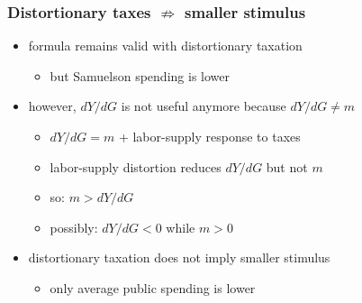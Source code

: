 \documentclass[12pt,xcolor={dvipsnames},hyperref={pdftex,pdfpagemode=UseNone,hidelinks,pdfdisplaydoctitle=true},usepdftitle=false]{beamer}
\begin{document}
\begin{frame}
\frametitle{Distortionary taxes $\nRightarrow$ smaller stimulus}
\begin{itemize}
\item formula remains valid with distortionary taxation
\begin{itemize}
	\item but Samuelson spending is lower
\end{itemize}
\item however, $dY/dG$ is not useful anymore because $dY/dG \neq m$
\begin{itemize}
\item $dY/dG = m$ + labor-supply response to taxes 
\item labor-supply distortion reduces $dY/dG$ but not $m$
\item so: $ m > dY/dG$
\item possibly: $dY/dG<0$ while $m>0$
\end{itemize}
\item distortionary taxation does not imply smaller stimulus
\begin{itemize}
\item only average public spending is lower
\end{itemize}
\end{itemize}
\end{frame}
\end{document}
